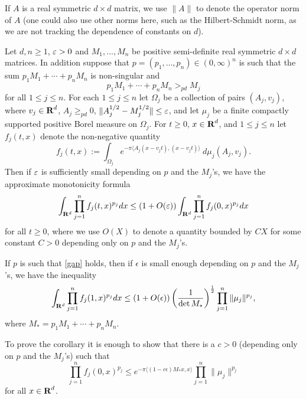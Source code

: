 If $A$ is a real symmetric $d \times d$ matrix, we use $\|A\|$ to denote the operator norm
of $A$ (one could also use other norms here, such as the Hilbert-Schmidt norm, as we are not tracking
the dependence of constants on $d$).

\begin{proposition}\label{wowgen}
Let $d,n\geq 1$, $\varepsilon > 0$ and $M_{1},\hdots,M_{n}$ be positive
semi-definite real symmetric $d\times d$ matrices. In addition
suppose that
$p=(p_{1},\hdots,p_n)\in (0,\infty)^{n}$ is such that the sum
$p_{1}M_{1}+\cdots+p_{n}M_{n}$ is non-singular and
\begin{equation}\label{gap}
p_{1}M_{1}+\cdots+p_{n}M_{n}>_{pd} M_{j}
\end{equation}
for all $1\leq j\leq n$. For each $1\leq j\leq n$ let $\Omega_j$
be a collection of pairs $(A_j,v_j)$, where $v_j \in {\hbox{\bf R}}^d$, $A_j
\geq_{pd} 0$, $\|A_j^{1/2} - M_j^{1/2} \| \leq \varepsilon$, and let
$\mu_j$ be a finite compactly supported positive Borel
measure on $\Omega_j$.  For $t \geq 0$, $x
\in {\hbox{\bf R}}^d$, and $1 \leq j \leq n$ let $f_j(t,x)$ denote the
non-negative quantity
$$ f_j(t,x) := \int_{\Omega_j} e^{-\pi \langle A_j(x-v_jt), (x-v_jt) \rangle}\ d\mu_j(A_j,v_j).$$
Then if $\varepsilon$ is sufficiently small depending on $p$ and the
$M_{j}$'s, we have the approximate monotonicity formula
$$\int_{{\bf R}^{d}}\prod_{j=1}^n f_j(t,x)^{p_{j}}dx\leq (1 + O(\varepsilon))
\int_{{\bf R}^d} \prod_{j=1}^n f_j(0,x)^{p_{j}}dx$$ for all $t
\geq 0$, where we use $O(X)$ to denote a quantity bounded by $C X$
for some constant $C> 0$ depending only on $p$ and the $M_{j}$'s.
\end{proposition}
\begin{corollary}\label{corwow}
If $p$ is such that \eqref{gap} holds, then if $\epsilon$ is small
enough depending on $p$ and the $M_j$'s, we have the inequality
$$\int_{{\bf R}^{d}}\prod_{j=1}^{n}f_{j}(1,x)^{p_{j}}dx
\leq (1+O(\epsilon))\left(\frac{1}{\det
M_*}\right)^{\frac{1}{2}}\prod_{j=1}^{n}\|\mu_{j}\|^{p_{j}},
$$
where $M_*=p_1M_1+\cdots+p_nM_n$.
\end{corollary}
To prove the corollary it is enough to show that
there is a $c>0$ (depending only on $p$ and the $M_j$'s) such that
\begin{equation}\label{labour}
\prod_{j=1}^{n}f_{j}(0,x)^{p_{j}}\leq
e^{-\pi\langle(1-c\epsilon)M_*x,x\rangle}\prod_{j=1}^{n}\|\mu_{j}\|^{p_{j}}
\end{equation}
for all $x\in{\hbox{\bf R}}^{d}$.
